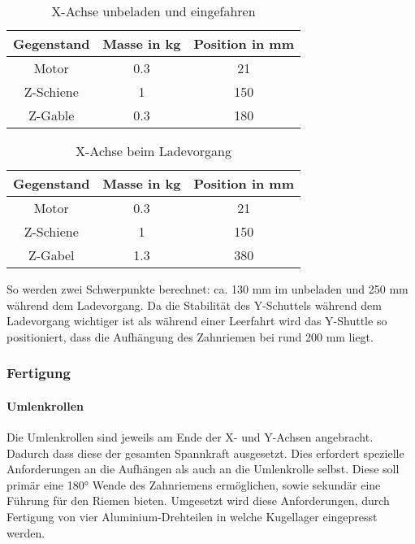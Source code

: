    \begin{table}[h!]
        \centering
        \centering
            \begin{tabular}{c c c}
                Gegenstand & Masse in kg & Position in mm\\
                \hline
                Motor & 0.3 & 21 \\
                Z-Schiene & 1 & 150 \\
                Z-Gable & 0.3 & 180 
            \end{tabular}
        \caption{X-Achse unbeladen und eingefahren}
        \end{table}
    \begin{table}[h!]
            \centering
            \begin{tabular}{c c c}
                Gegenstand & Masse in kg & Position in mm\\ 
                \hline
                Motor & 0.3 & 21 \\
                Z-Schiene & 1 & 150 \\
                Z-Gabel & 1.3 & 380
            \end{tabular}
            \caption{X-Achse beim Ladevorgang}
        \end{table}

        \vspace{5mm}
        So werden zwei Schwerpunkte berechnet: ca. 130 mm im unbeladen und 250 mm während dem Ladevorgang. Da die Stabilität des Y-Schuttels während dem Ladevorgang wichtiger ist als während einer Leerfahrt wird das Y-Shuttle so positioniert, dass die Aufhängung des Zahnriemen bei rund 200 mm liegt. 
    

\subsubsection{Fertigung}

\paragraph{Umlenkrollen}
Die Umlenkrollen sind jeweils am Ende der X- und Y-Achsen angebracht. Dadurch dass diese der gesamten Spannkraft ausgesetzt. Dies erfordert spezielle Anforderungen an die Aufhängen als auch an die Umlenkrolle selbst. Diese soll primär eine 180° Wende des Zahnriemens ermöglichen, sowie sekundär eine Führung für den Riemen bieten. 
Umgesetzt wird diese Anforderungen, durch Fertigung von vier Aluminium-Drehteilen in welche Kugellager eingepresst werden.

